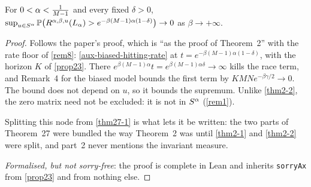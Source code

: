 \begin{theorem}
  \label{thm27-2}
  \leanok
  For $0 < \alpha < \tfrac{1}{M-1}$ and every fixed $\delta > 0$,
  $\sup_{u \in S^\alpha} \mathbb{P}\bigl( R^{\alpha,\beta,u}(L_\alpha)
   > e^{-\beta(M-1)\alpha(1-\delta)} \bigr) \to 0$ as $\beta \to +\infty$.
\end{theorem}
\begin{proof}
  \leanok
  Follows the paper's proof, which is ``as the proof of Theorem~2'' with the
  rate floor of \ref{rem8}: \ref{aux-biased-hitting-rate} at $t =
  e^{-\beta(M-1)\alpha(1-\delta)}$, with the horizon $K$ of \ref{prop23}.
  There $e^{\beta(M-1)\alpha} t = e^{\beta(M-1)\alpha\delta} \to \infty$ kills
  the race term, and Remark~4 for the biased model bounds the first term by
  $K MN e^{-\beta\gamma/2} \to 0$.  The bound does not depend on $u$, so it
  bounds the supremum.  Unlike \ref{thm2-2}, the zero matrix need not be
  excluded: it is not in $S^\alpha$ (\ref{rem1}).

  Splitting this node from \ref{thm27-1} is what lets it be written: the two
  parts of Theorem~27 were bundled the way Theorem~2 was until \ref{thm2-1} and
  \ref{thm2-2} were split, and part~2 never mentions the invariant measure.

  \emph{Formalised, but not sorry-free}: the proof is complete in Lean and
  inherits \texttt{sorryAx} from \ref{prop23} and from nothing else.
\end{proof}

